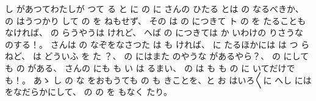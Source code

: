 し
があつてわたしが
つて
る
と
に
の
に
さんの
ひたる
とは
の
なるべきか、
の
はうつかり
して
の
を
ねもせず、
その
は
の
につきて
ト
の
を
たることもなければ、
の
らうやうは
けれど、
へば
の
につきては
か
いわけの
りさうな
のする！。
さんは
の
なぞをなさつた
は
も
ければ、
に
たるほかには
は
つ
らねど、
は
どういふ
を
た
？、
の
にはまた
のやうな
があるやら？、
の
にしても
の
がある、
さんの
にも
も
い
は
るまい、
の
は
も
も
の
に
いてだけでも！。
あゝ
し
の
な
をおもうても
の
も
きことを、と
お
はいろ〳〵に
へし
には
をなだらかにして、
の
の
を
もなく
たり。

